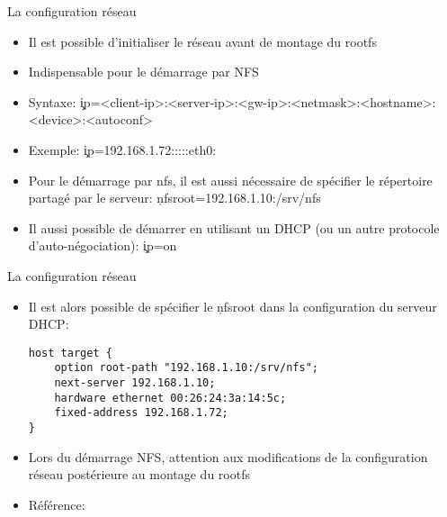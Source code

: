 \begin{frame}[fragile=singleslide]{La configuration réseau}
  \begin{itemize}
  \item Il est possible d'initialiser le réseau avant de montage du rootfs
  \item Indispensable pour le démarrage par NFS
  \item Syntaxe: \c{ip=<client-ip>:<server-ip>:<gw-ip>:<netmask>:<hostname>:<device>:<autoconf>} 
  \item Exemple: \c{ip=192.168.1.72:::::eth0:}
  \item  Pour  le  démarrage  par  nfs, il  est  aussi  nécessaire  de
    spécifier    le    répertoire     partagé    par    le    serveur:
    \c{nfsroot=192.168.1.10:/srv/nfs}
  \item  Il aussi possible  de démarrer  en utilisant  un DHCP  (ou un
    autre protocole d'auto-négociation): \c{ip=on}
  \end{itemize}
\end{frame} 

\begin{frame}[fragile=singleslide]{La configuration réseau}
  \begin{itemize} 
  \item  Il est  alors possible  de spécifier  le \c{nfsroot}  dans la
    configuration du serveur DHCP:
     \begin{lstlisting} 
host target {
    option root-path "192.168.1.10:/srv/nfs";
    next-server 192.168.1.10;
    hardware ethernet 00:26:24:3a:14:5c;
    fixed-address 192.168.1.72;
}
     \end{lstlisting} 
   \item  Lors du  démarrage NFS,  attention aux  modifications  de la
     configuration réseau postérieure au montage du rootfs
    \item Référence: 
  \end{itemize} 
\end{frame} 

